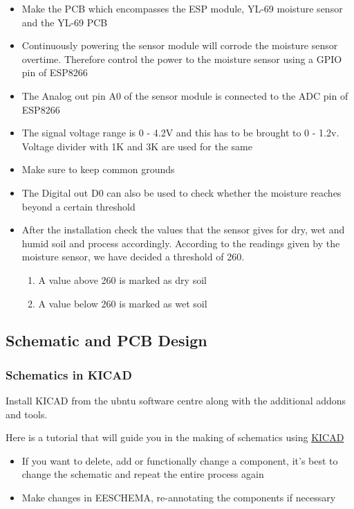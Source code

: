 \documentclass[16pt]{article}
\begin{document}
\begin{itemize}

\item
  Make the PCB which encompasses the ESP module, YL-69 moisture sensor
  and the YL-69 PCB
\item
  Continuously powering the sensor module will corrode the moisture
  sensor overtime. Therefore control the power to the moisture sensor
  using a GPIO pin of ESP8266
\item
  The Analog out pin A0 of the sensor module is connected to the ADC pin
  of ESP8266
\item
  The signal voltage range is 0 - 4.2V and this has to be brought to 0 -
  1.2v. Voltage divider with 1K and 3K are used for the same
\item
  Make sure to keep common grounds
\item
  The Digital out D0 can also be used to check whether the moisture
  reaches beyond a certain threshold
\item
  After the installation check the values that the sensor gives for dry,
  wet and humid soil and process accordingly. According to the readings given by the 
  moisture sensor, we have decided a threshold of 260. 
\begin{enumerate}
 \item A value above 260 is marked as dry soil
 \item A value below 260 is marked as wet soil 
\end{enumerate}


  
\end{itemize}

\vspace{0.5cm}

\subsection{Schematic and PCB
Design}



\subsubsection{Schematics in KICAD}
Install KICAD from the ubntu software centre along with the additional
addons and tools.

Here is a tutorial that will guide you in the making of schematics using
\href{https://www.youtube.com/watch?v=rkQ0nVX1q1k}{KICAD}

\begin{itemize}

\item
  If you want to delete, add or functionally change a component, it's
  best to change the schematic and repeat the entire process again
\item
  Make changes in EESCHEMA, re-annotating the components if necessary
  \vspace{0.2cm}
\end{itemize}
\end{document}
